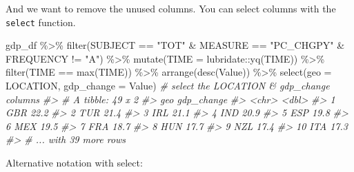 \documentclass[
]{article}
\newenvironment{Shaded}{\begin{snugshade}}{\end{snugshade}}
\newcommand{\AttributeTok}[1]{\textcolor[rgb]{0.77,0.63,0.00}{#1}}
\newcommand{\CommentTok}[1]{\textcolor[rgb]{0.56,0.35,0.01}{\textit{#1}}}
\newcommand{\FunctionTok}[1]{\textcolor[rgb]{0.00,0.00,0.00}{#1}}
\newcommand{\NormalTok}[1]{#1}
\newcommand{\SpecialCharTok}[1]{\textcolor[rgb]{0.00,0.00,0.00}{#1}}
\newcommand{\StringTok}[1]{\textcolor[rgb]{0.31,0.60,0.02}{#1}}
\begin{document}
And we want to remove the unused columns. You can select columns with the \texttt{select} function.

\begin{Shaded}
\begin{Highlighting}[]
\NormalTok{gdp\_df }\SpecialCharTok{\%\textgreater{}\%} 
  \FunctionTok{filter}\NormalTok{(SUBJECT }\SpecialCharTok{==} \StringTok{"TOT"} \SpecialCharTok{\&}\NormalTok{ MEASURE }\SpecialCharTok{==} \StringTok{"PC\_CHGPY"} \SpecialCharTok{\&}\NormalTok{ FREQUENCY }\SpecialCharTok{!=} \StringTok{"A"}\NormalTok{) }\SpecialCharTok{\%\textgreater{}\%} 
  \FunctionTok{mutate}\NormalTok{(}\AttributeTok{TIME =}\NormalTok{ lubridate}\SpecialCharTok{::}\FunctionTok{yq}\NormalTok{(TIME)) }\SpecialCharTok{\%\textgreater{}\%} 
  \FunctionTok{filter}\NormalTok{(TIME }\SpecialCharTok{==} \FunctionTok{max}\NormalTok{(TIME)) }\SpecialCharTok{\%\textgreater{}\%} 
  \FunctionTok{arrange}\NormalTok{(}\FunctionTok{desc}\NormalTok{(Value)) }\SpecialCharTok{\%\textgreater{}\%} 
  \FunctionTok{select}\NormalTok{(}\AttributeTok{geo =}\NormalTok{ LOCATION, }\AttributeTok{gdp\_change =}\NormalTok{ Value) }\CommentTok{\# select the LOCATION \& gdp\_change columns}
\CommentTok{\#\textgreater{} \# A tibble: 49 x 2}
\CommentTok{\#\textgreater{}    geo   gdp\_change}
\CommentTok{\#\textgreater{}    \textless{}chr\textgreater{}      \textless{}dbl\textgreater{}}
\CommentTok{\#\textgreater{}  1 GBR         22.2}
\CommentTok{\#\textgreater{}  2 TUR         21.4}
\CommentTok{\#\textgreater{}  3 IRL         21.1}
\CommentTok{\#\textgreater{}  4 IND         20.9}
\CommentTok{\#\textgreater{}  5 ESP         19.8}
\CommentTok{\#\textgreater{}  6 MEX         19.5}
\CommentTok{\#\textgreater{}  7 FRA         18.7}
\CommentTok{\#\textgreater{}  8 HUN         17.7}
\CommentTok{\#\textgreater{}  9 NZL         17.4}
\CommentTok{\#\textgreater{} 10 ITA         17.3}
\CommentTok{\#\textgreater{} \# ... with 39 more rows}
\end{Highlighting}
\end{Shaded}

Alternative notation with select:
\end{document}
